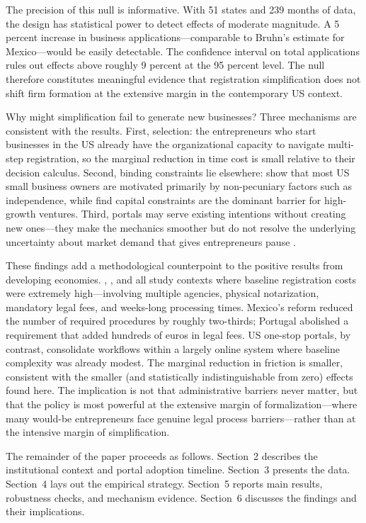 \documentclass[12pt]{article}
\begin{document}
The precision of this null is informative. With 51 states and 239 months of data, the design has statistical power to detect effects of moderate magnitude. A 5 percent increase in business applications---comparable to Bruhn's estimate for Mexico---would be easily detectable. The confidence interval on total applications rules out effects above roughly 9 percent at the 95 percent level. The null therefore constitutes meaningful evidence that registration simplification does not shift firm formation at the extensive margin in the contemporary US context.

Why might simplification fail to generate new businesses? Three mechanisms are consistent with the results. First, selection: the entrepreneurs who start businesses in the US already have the organizational capacity to navigate multi-step registration, so the marginal reduction in time cost is small relative to their decision calculus. Second, binding constraints lie elsewhere: \citet{hurst2011} show that most US small business owners are motivated primarily by non-pecuniary factors such as independence, while \citet{kerr2010} find capital constraints are the dominant barrier for high-growth ventures. Third, portals may serve existing intentions without creating new ones---they make the mechanics smoother but do not resolve the underlying uncertainty about market demand that gives entrepreneurs pause \citep{hall2010}.

These findings add a methodological counterpoint to the positive results from developing economies. \citet{bruhn2011}, \citet{branstetter2014}, and \citet{kaplan2011} all study contexts where baseline registration costs were extremely high---involving multiple agencies, physical notarization, mandatory legal fees, and weeks-long processing times. Mexico's reform reduced the number of required procedures by roughly two-thirds; Portugal abolished a requirement that added hundreds of euros in legal fees. US one-stop portals, by contrast, consolidate workflows within a largely online system where baseline complexity was already modest. The marginal reduction in friction is smaller, consistent with the smaller (and statistically indistinguishable from zero) effects found here. The implication is not that administrative barriers never matter, but that the policy is most powerful at the extensive margin of formalization---where many would-be entrepreneurs face genuine legal process barriers---rather than at the intensive margin of simplification.

The remainder of the paper proceeds as follows. Section~2 describes the institutional context and portal adoption timeline. Section~3 presents the data. Section~4 lays out the empirical strategy. Section~5 reports main results, robustness checks, and mechanism evidence. Section~6 discusses the findings and their implications.
\end{document}
